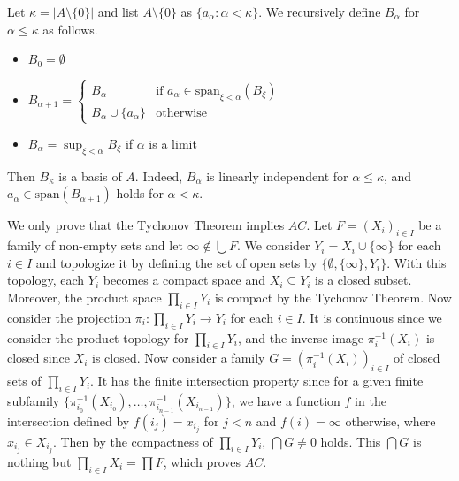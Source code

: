 \documentclass[12pt]{article}
\theoremstyle{definition}
\newenvironment{customthm}[1]
  {\renewcommand\theinnercustomthm{#1}\innercustomthm}
  {\endinnercustomthm}
\begin{document}
\begin{customthm}{I.12.5}
  Let $\kappa=|A\setminus\{0\}|$ and list $A\setminus\{0\}$ as $\{a_\alpha:\alpha<\kappa\}$. We recursively define $B_\alpha$ for $\alpha\leq\kappa$ as follows.
  \begin{itemize}
    \item $B_0=\emptyset$
    \item $B_{\alpha+1}=
      \begin{cases}
        B_\alpha & \text{if }a_\alpha\in\textrm{span}_{\xi<\alpha}(B_\xi) \\
        B_\alpha\cup\{a_\alpha\} & \text{otherwise}
      \end{cases}$
    \item $B_\alpha=\sup_{\xi<\alpha}B_\xi$ if $\alpha$ is a limit
  \end{itemize}
  Then $B_\kappa$ is a basis of $A$. Indeed, $B_\alpha$ is linearly independent for $\alpha\leq\kappa$, and $a_\alpha\in\textrm{span}(B_{\alpha+1})$ holds for $\alpha<\kappa$.
\end{customthm}

\begin{customthm}{I.12.6}
  We only prove that the Tychonov Theorem implies $AC$. Let $F=(X_i)_{i\in I}$ be a family of non-empty sets and let $\infty\not\in\bigcup F$. We consider $Y_i=X_i\cup\{\infty\}$ for each $i\in I$ and topologize it by defining the set of open sets by $\{\emptyset,\{\infty\},Y_i\}$. With this topology, each $Y_i$ becomes a compact space and $X_i\subseteq Y_i$ is a closed subset. Moreover, the product space $\prod_{i\in I}Y_i$ is compact by the Tychonov Theorem. Now consider the projection $\pi_i:\prod_{i\in I}Y_i\rightarrow Y_i$ for each $i\in I$. It is continuous since we consider the product topology for $\prod_{i\in I}Y_i$, and the inverse image $\pi_i^{-1}(X_i)$ is closed since $X_i$ is closed. Now consider a family $G=(\pi_i^{-1}(X_i))_{i\in I}$ of closed sets of $\prod_{i\in I}Y_i$. It has the finite intersection property since for a given finite subfamily $\{\pi_{i_0}^{-1}(X_{i_0}),\ldots,\pi_{i_{n-1}}^{-1}(X_{i_{n-1}})\}$, we have a function $f$ in the intersection defined by $f(i_j)=x_{i_j}$ for $j<n$ and $f(i)=\infty$ otherwise, where $x_{i_j}\in X_{i_j}$. Then by the compactness of $\prod_{i\in I}Y_i$, $\bigcap G\neq0$ holds. This $\bigcap G$ is nothing but $\prod_{i\in I}X_i=\prod F$, which proves $AC$.
\end{customthm}
\end{document}
